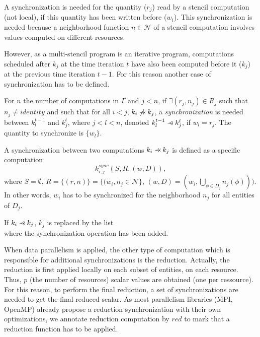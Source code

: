 A synchronization is needed for the quantity ($r_j$) read by a stencil computation (not local), if this quantity has been written before ($w_i$). This synchronization is needed because a neighborhood function $n \in \mathcal{N}$ of a stencil computation involves values computed on different resources.

However, as a multi-stencil program is an iterative program, computations scheduled after $k_j$ at the time iteration $t$ have also been computed before it ($k_j$) at the previous time iteration $t-1$. For this reason another case of synchronization has to be defined.

\begin{mydef}
For $n$ the number of computations in $\Gamma$ and $j<n$, if $\exists (r_j,n_j) \in R_j$ such that $n_j\neq identity$ and such that for all $i<j$, $k_i \not \pprec k_j$, a \textit{synchronization} is needed between $k_l^{t-1}$ and $k_j^t$, where $j<l<n$, denoted $k_l^{t-1} \pprec k_j^{t}$, if $w_l=r_j$. The quantity to synchronize is $\{w_l\}$.
\label{def:sync2}
\end{mydef}

\begin{mydef}
A synchronization between two computations $k_i \pprec k_j$ is defined as a specific computation 
\begin{equation*}
k_{i,j}^{sync}(S,R,(w,D)), 
\end{equation*}
where $S=\emptyset$, $R=\{(r,n)\}=\{(w_i,n_j \in \mathcal{N}\}$, $(w,D)=(w_i,\bigcup_{\phi \in D_j} n_j(\phi)))$. In other words, $w_i$ has to be synchronized for the neighborhood $n_j$ for all entities of $D_j$.
\label{def:sync3}
\end{mydef}

\begin{mydef}
If $k_i \pprec k_j$, $k_j$ is replaced by the list
\begin{equation*}
[k_{i,j}^{sync}, k_j]
\end{equation*}
where the synchronization operation has been added.
\end{mydef}

When data parallelism is applied, the other type of computation which is responsible for additional synchronizations is the reduction. Actually, the reduction is first applied locally on each subset of entities, on each resource. Thus, $p$ (the number of resources) scalar values are obtained (one per ressource). For this reason, to perform the final reduction, a set of synchronizations are needed to get the final reduced scalar. As most parallelism libraries (MPI, OpenMP) already propose a reduction synchronization with their own optimizations, we annotate reduction computation by $red$ to mark that a reduction function has to be applied.


